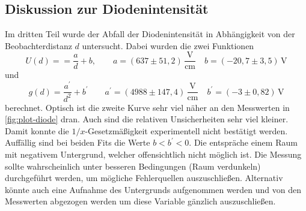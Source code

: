 \subsection{Diskussion zur Diodenintensität}
\label{sec:Diskussion zur Diodenintensität}
Im dritten Teil wurde der Abfall der Diodenintensität in Abhängigkeit von der
Beobachterdistanz $d$ untersucht. Dabei wurden die zwei Funktionen
\begin{equation}
	U(d) = = \frac{a}{d} + b,
	\qquad
	a = (637 \pm 51,2) \, \frac{\si{\volt}}{\si{\centi\meter}}
	\quad
	b = (-20,7 \pm 3,5) \, \si{\volt}
\end{equation}
und 
\begin{equation}
	g(d) = \frac{a^\prime}{d^2} + b^\prime
	\qquad
	a^\prime = (4988 \pm 147,4) \, \frac{\si{\volt}}{\si{\centi\meter}}
	\quad
	b^\prime = (-3 \pm 0,82) \, \si{\volt}
\end{equation}
berechnet. Optisch ist die zweite Kurve sehr viel näher an den Messwerten in
\autoref{fig:plot-diode} dran. Auch sind die relativen Unsicherheiten sehr viel kleiner.
Damit konnte die $1/x$-Gesetzmäßigkeit experimentell nicht bestätigt werden.
\\
Auffällig sind bei beiden Fits die Werte $b < b^\prime < 0$. Die entspräche einem Raum mit
negativem Untergrund, welcher offensichtlich nicht möglich ist. Die Messung sollte
wahrscheinlich unter besseren Bedingungen (Raum verdunkeln) durchgeführt werden, um
mögliche Fehlerquellen auszuschließen. Alternativ könnte auch eine Aufnahme des
Untergrunds aufgenommen werden und von den Messwerten abgezogen werden um diese Variable
gänzlich auszuschließen.

